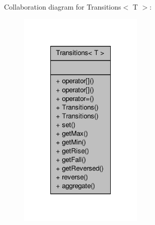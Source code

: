 Collaboration diagram for Transitions$<$ T $>$\-:\nopagebreak
\begin{figure}[H]
\begin{center}
\leavevmode
\includegraphics[width=168pt]{classTransitions__coll__graph}
\end{center}
\end{figure}
